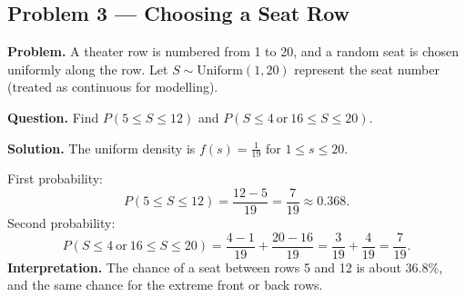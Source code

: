 \begin{ExamProblems}
		
		\hypertarget{c2-ex3}{}
		\item
		\subsection*{Problem 3 — Choosing a Seat Row}
		
		\textbf{Problem.}
		A theater row is numbered from 1 to 20, and a random seat is chosen uniformly along the row.
		Let \(S\sim\text{Uniform}(1,20)\) represent the seat number (treated as continuous for modelling).
		
		\textbf{Question.} Find \(P(5\le S\le 12)\) and \(P(S\le 4\ \text{or}\ 16\le S\le 20)\).
		
		\textbf{Solution.}
		The uniform density is \(f(s)=\frac{1}{19}\) for \(1\le s\le 20\).
		
		First probability:
		\[
		P(5\le S\le 12)=\frac{12-5}{19}=\frac{7}{19}\approx 0.368.
		\]
		Second probability:
		\[
		P(S\le 4\ \text{or}\ 16\le S\le 20)=\frac{4-1}{19}+\frac{20-16}{19}
		=\frac{3}{19}+\frac{4}{19}=\frac{7}{19}.
		\]
		\textbf{Interpretation.} The chance of a seat between rows 5 and 12 is about 36.8\%,
		and the same chance for the extreme front or back rows.
		
	\end{ExamProblems}
	
	
